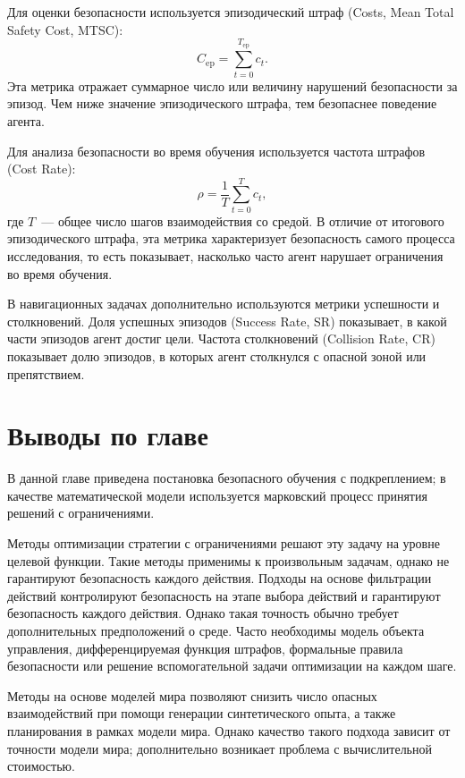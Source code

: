 Для оценки безопасности используется эпизодический штраф (Costs, Mean Total Safety Cost, MTSC):
\begin{equation}
C_{\mathrm{ep}} = \sum_{t=0}^{T_{\mathrm{ep}}} c_t.
\end{equation}
Эта метрика отражает суммарное число или величину нарушений безопасности за эпизод. Чем ниже значение эпизодического штрафа, тем безопаснее поведение агента.

Для анализа безопасности во время обучения используется частота штрафов (Cost Rate):
\begin{equation}
\rho = \frac{1}{T}\sum_{t=0}^{T} c_t,
\end{equation}
где $T$~--- общее число шагов взаимодействия со средой. В отличие от итогового эпизодического штрафа, эта метрика характеризует безопасность самого процесса исследования, то есть показывает, насколько часто агент нарушает ограничения во время обучения.

В навигационных задачах дополнительно используются метрики успешности и столкновений. Доля успешных эпизодов (Success Rate, SR) показывает, в какой части эпизодов агент достиг цели. Частота столкновений (Collision Rate, CR) показывает долю эпизодов, в которых агент столкнулся с опасной зоной или препятствием.

\section{Выводы по главе}
\label{sec:chapter1_conclusion}

В данной главе приведена постановка безопасного обучения с подкреплением; в качестве математической модели используется марковский процесс принятия решений с ограничениями.

Методы оптимизации стратегии с ограничениями решают эту задачу на уровне целевой функции. Такие методы применимы к произвольным задачам, однако не гарантируют безопасность каждого действия. Подходы на основе фильтрации действий контролируют безопасность на этапе выбора действий и гарантируют безопасность каждого действия. Однако такая точность обычно требует дополнительных предположений о среде. Часто необходимы модель объекта управления, дифференцируемая функция штрафов, формальные правила безопасности или решение вспомогательной задачи оптимизации на каждом шаге.

Методы на основе моделей мира позволяют снизить число опасных взаимодействий при помощи генерации синтетического опыта, а также планирования в рамках модели мира. Однако качество такого подхода зависит от точности модели мира; дополнительно возникает проблема с вычислительной стоимостью.

